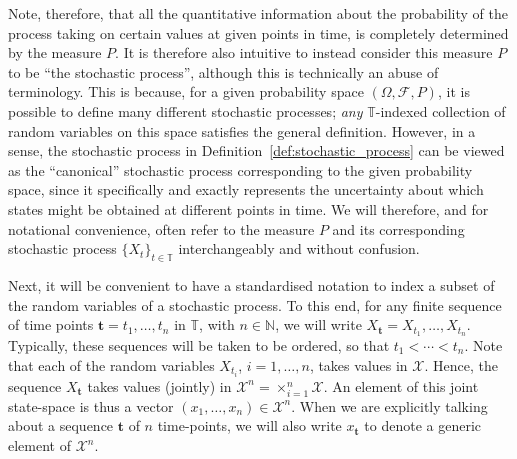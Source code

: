 \documentclass[graybox]{svmult}
\newcommand{\nats}{\mathbb{N}}
\newcommand{\states}{\mathcal{X}}
\newcommand{\timedim}{\mathbb{T}}
\begin{document}
Note, therefore, that all the quantitative information about the probability of the process taking on certain values at given points in time, is completely determined by the measure $P$. It is therefore also intuitive to instead consider this measure $P$ to be ``the stochastic process'', although this is technically an abuse of terminology. This is because, for a given probability space $(\Omega,\mathcal{F},P)$, it is possible to define many different stochastic processes; \emph{any} $\timedim$-indexed collection of random variables on this space satisfies the general definition. However, in a sense, the stochastic process in Definition~\ref{def:stochastic_process} can be viewed as the ``canonical'' stochastic process corresponding to the given probability space, since it specifically and exactly represents the uncertainty about which states might be obtained at different points in time. We will therefore, and for notational convenience, often refer to the measure $P$ and its corresponding stochastic process $\{X_t\}_{t\in\timedim}$ interchangeably and without confusion.

Next, it will be convenient to have a standardised notation to index a subset of the random variables of a stochastic process. To this end, for any finite sequence of time points $\mathbf{t}=t_1,\ldots,t_n$ in $\timedim$, with $n\in\nats$, we will write $X_\mathbf{t}=X_{t_1},\ldots,X_{t_n}$. Typically, these sequences will be taken to be ordered, so that $t_1<\cdots<t_n$. Note that each of the random variables $X_{t_i}$, $i=1,\ldots,n$, takes values in $\states$. Hence, the sequence $X_\mathbf{t}$ takes values (jointly) in $\states^n=\times_{i=1}^n\states$. An element of this joint state-space is thus a vector $(x_1,\ldots,x_n)\in\states^n$. When we are explicitly talking about a sequence $\mathbf{t}$ of $n$ time-points, we will also write $x_\mathbf{t}$ to denote a generic element of $\states^n$.
\end{document}
